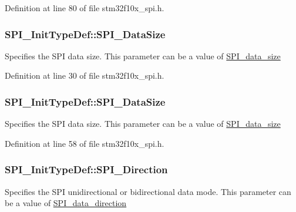 Definition at line 80 of file stm32f10x\+\_\+spi.\+h.

\subsubsection[{\texorpdfstring{S\+P\+I\+\_\+\+Data\+Size}{SPI_DataSize}}]{ S\+P\+I\+\_\+\+Init\+Type\+Def\+::\+S\+P\+I\+\_\+\+Data\+Size}\hypertarget{struct_s_p_i___init_type_def_a0e66cfa859e4ea82b4f6128548802a6d}{}\label{struct_s_p_i___init_type_def_a0e66cfa859e4ea82b4f6128548802a6d}
Specifies the S\+PI data size. This parameter can be a value of \hyperlink{group___s_p_i__data__size}{S\+P\+I\+\_\+data\+\_\+size} 

Definition at line 30 of file stm32f10x\+\_\+spi.\+h.

\subsubsection[{\texorpdfstring{S\+P\+I\+\_\+\+Data\+Size}{SPI_DataSize}}]{ S\+P\+I\+\_\+\+Init\+Type\+Def\+::\+S\+P\+I\+\_\+\+Data\+Size}\hypertarget{struct_s_p_i___init_type_def_a0e63950d46a6483f9b7048b8c97800b8}{}\label{struct_s_p_i___init_type_def_a0e63950d46a6483f9b7048b8c97800b8}
Specifies the S\+PI data size. This parameter can be a value of \hyperlink{group___s_p_i__data__size}{S\+P\+I\+\_\+data\+\_\+size} 

Definition at line 58 of file stm32f10x\+\_\+spi.\+h.

\subsubsection[{\texorpdfstring{S\+P\+I\+\_\+\+Direction}{SPI_Direction}}]{ S\+P\+I\+\_\+\+Init\+Type\+Def\+::\+S\+P\+I\+\_\+\+Direction}\hypertarget{struct_s_p_i___init_type_def_a12fb83160740b0cf952ff7fd011086a6}{}\label{struct_s_p_i___init_type_def_a12fb83160740b0cf952ff7fd011086a6}
Specifies the S\+PI unidirectional or bidirectional data mode. This parameter can be a value of \hyperlink{group___s_p_i__data__direction}{S\+P\+I\+\_\+data\+\_\+direction} 

